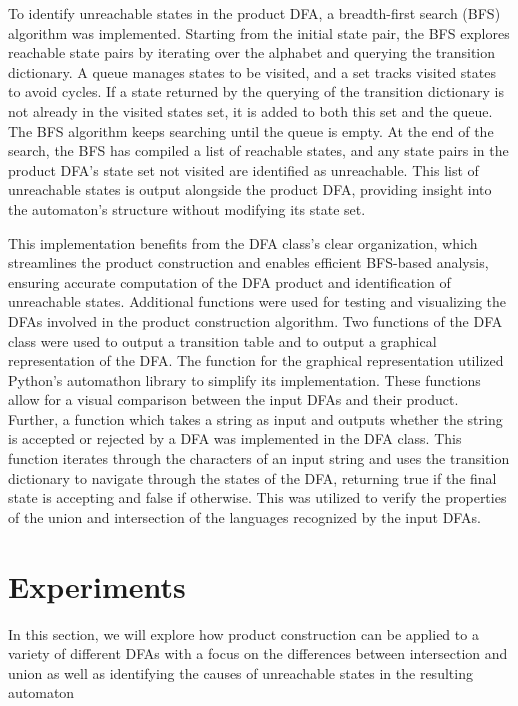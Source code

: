 \documentclass[conference]{IEEEtran}
\begin{document}
To identify unreachable states in the product DFA, a breadth-first search (BFS) algorithm was implemented. Starting from the initial state pair, the BFS explores reachable state pairs by iterating over the alphabet and querying the transition dictionary. A queue manages states to be visited, and a set tracks visited states to avoid cycles. If a state returned by the querying of the transition dictionary is not already in the visited states set, it is added to both this set and the queue. The BFS algorithm keeps searching until the queue is empty. At the end of the search, the BFS has compiled a list of reachable states, and any state pairs in the product DFA’s state set not visited are identified as unreachable. This list of unreachable states is output alongside the product DFA, providing insight into the automaton’s structure without modifying its state set.

This implementation benefits from the DFA class’s clear organization, which streamlines the product construction and enables efficient BFS-based analysis, ensuring accurate computation of the DFA product and identification of unreachable states. Additional functions were used for testing and visualizing the DFAs involved in the product construction algorithm. Two functions of the DFA class were used to output a transition table and to output a graphical representation of the DFA. The function for the graphical representation utilized Python's automathon library \cite{b2} to simplify its implementation. These functions allow for a visual comparison between the input DFAs and their product. Further, a function which takes a string as input and outputs whether the string is accepted or rejected by a DFA was implemented in the DFA class. This function iterates through the characters of an input string and uses the transition dictionary to navigate through the states of the DFA, returning true if the final state is accepting and false if otherwise. This was utilized to verify the properties of the union and intersection of the languages recognized by the input DFAs.

\section{Experiments}
In this section, we will explore how product construction can be applied to a variety of different DFAs with a focus on the differences between intersection and union as well as identifying the causes of unreachable states in the resulting automaton
\end{document}
